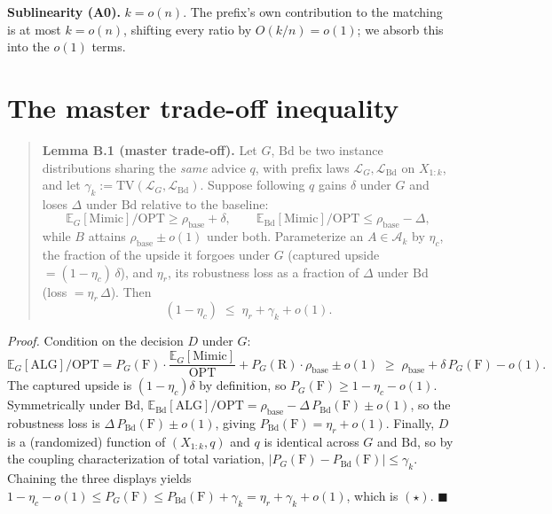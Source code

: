 \textbf{Sublinearity (A0).} \(k=o(n)\). The prefix's own contribution to
the matching is at most \(k=o(n)\), shifting every ratio by
\(O(k/n)=o(1)\); we absorb this into the \(o(1)\) terms.

\section{The master trade-off
inequality}

\begin{quote}
\textbf{Lemma B.1 (master trade-off).} Let \(G\), \(\mathrm{Bd}\) be two
instance distributions sharing the \emph{same} advice \(q\), with prefix
laws \(\mathcal L_G,\mathcal L_{\mathrm{Bd}}\) on \(X_{1:k}\), and let
\(\gamma_k := \mathrm{TV}(\mathcal L_G,\mathcal L_{\mathrm{Bd}})\).
Suppose following \(q\) gains \(\delta\) under \(G\) and loses
\(\Delta\) under \(\mathrm{Bd}\) relative to the baseline:
\[\mathbb E_G[\mathrm{Mimic}]/\mathrm{OPT} \ge \rho_{\mathrm{base}}+\delta,
\qquad \mathbb E_{\mathrm{Bd}}[\mathrm{Mimic}]/\mathrm{OPT} \le \rho_{\mathrm{base}}-\Delta,\]
while \(B\) attains \(\rho_{\mathrm{base}}\pm o(1)\) under both.
Parameterize an \(A\in\mathcal A_k\) by \(\eta_c\), the fraction of the
upside it forgoes under \(G\) (captured upside \(=(1-\eta_c)\,\delta\)),
and \(\eta_r\), its robustness loss as a fraction of \(\Delta\) under
\(\mathrm{Bd}\) (loss \(=\eta_r\,\Delta\)). Then
\[(1-\eta_c)\;\le\;\eta_r+\gamma_k+o(1). \tag{$\star$}\]
\end{quote}

\emph{Proof.} Condition on the decision \(D\) under \(G\):
\[\mathbb E_G[\mathrm{ALG}]/\mathrm{OPT}
= P_G(\mathrm F)\cdot\frac{\mathbb E_G[\mathrm{Mimic}]}{\mathrm{OPT}}
+ P_G(\mathrm R)\cdot\rho_{\mathrm{base}} \pm o(1)
\;\ge\; \rho_{\mathrm{base}}+\delta\,P_G(\mathrm F)-o(1).\] The captured
upside is \((1-\eta_c)\delta\) by definition, so
\(P_G(\mathrm F)\ge 1-\eta_c-o(1)\). Symmetrically under
\(\mathrm{Bd}\), \(\mathbb E_{\mathrm{Bd}}[\mathrm{ALG}]/\mathrm{OPT}
= \rho_{\mathrm{base}}-\Delta\,P_{\mathrm{Bd}}(\mathrm F)\pm o(1)\), so
the robustness loss is \(\Delta\,P_{\mathrm{Bd}}(\mathrm F)\pm o(1)\),
giving \(P_{\mathrm{Bd}}(\mathrm F)=\eta_r+o(1)\). Finally, \(D\) is a
(randomized) function of \((X_{1:k},q)\) and \(q\) is identical across
\(G\) and \(\mathrm{Bd}\), so by the coupling characterization of total
variation, \(|P_G(\mathrm F)-P_{\mathrm{Bd}}(\mathrm F)|\le \gamma_k\).
Chaining the three displays yields
\(1-\eta_c-o(1)\le P_G(\mathrm F)\le P_{\mathrm{Bd}}(\mathrm F)+\gamma_k
= \eta_r+\gamma_k+o(1)\), which is \((\star)\). \(\blacksquare\)

